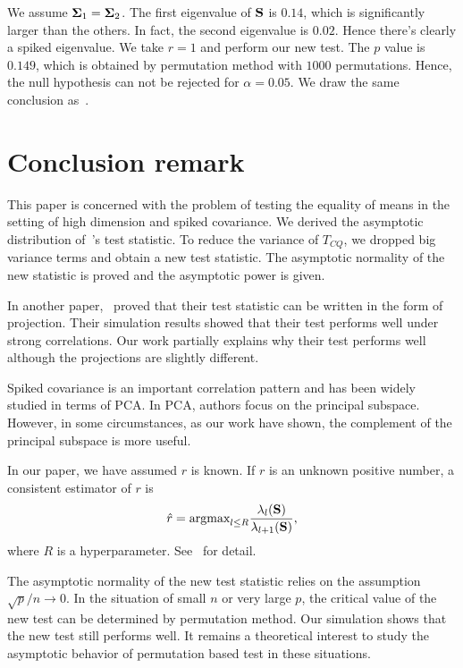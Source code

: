 \documentclass[review]{elsarticle}
\theoremstyle{plain}
\theoremstyle{definition}
\theoremstyle{remark}
\begin{document}
We assume $\boldsymbol{\Sigma}_1=\boldsymbol{\Sigma}_2$.
The first eigenvalue of $\mathbf{S}$ is $0.14$, which is significantly larger than the others.
In fact, the second eigenvalue is $0.02$.
Hence there's clearly a spiked eigenvalue.
We take $r=1$ and perform our new test.
The $p$ value is $0.149$, which is obtained by permutation method with $1000$ permutations.
Hence, the null hypothesis can not be rejected for $\alpha=0.05$.
We draw the same conclusion as~\cite{Ma2015A}.

\section{Conclusion remark}



This paper is concerned with the problem of testing the equality of means in the setting of high dimension and spiked covariance.
We derived the asymptotic distribution of~\cite{Chen2010A}'s test statistic.
To reduce the variance of $T_{CQ}$, we dropped big variance terms and obtain a new test statistic. The asymptotic normality of the new statistic is proved and the asymptotic power is given. %


In another paper,~\cite{Zhao2016A} proved that their test statistic can be written in the form of projection. Their simulation results showed that their test performs well under strong correlations.
Our work partially explains why their test performs well although the projections are slightly different. 

 Spiked covariance is an important correlation pattern and has been widely studied in terms of PCA\@.
 In PCA, authors focus on the principal subspace.
 However, in some circumstances, as our work have shown, the complement of the principal subspace is more useful. 

In our paper, we have assumed $r$ is known. If $r$ is an unknown positive number, a consistent estimator of $r$ is
\begin{equation}\label{estimateR}
    \hat{r}=\textrm{argmax}_{l\leq R}\frac{\lambda_l(\mathbf{S})}{\lambda_{l+1}(\mathbf{S})},
\end{equation}
where $R$ is a hyperparameter.
    See~\cite{Ahn2009Eigenvalue} for detail.


The asymptotic normality of the new test statistic relies on the assumption $\sqrt{p}/n\to 0$. In the situation of small $n$ or very large $p$, the critical value of the new test can be determined by permutation method. Our simulation shows that the new test still performs well. It remains a theoretical interest to study the asymptotic behavior of permutation based test in these situations.
\end{document}
